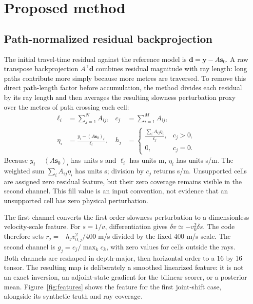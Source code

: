 \documentclass[11pt]{article}
\begin{document}
\section{Proposed method}
\label{sec:method}
\subsection{Path-normalized residual backprojection}
\label{sec:feature}
The initial travel-time residual against the reference model is $\mathbf{d}=\mathbf{y}-A\mathbf{s}_0$. A raw transpose backprojection $A^{\mathsf T}\mathbf{d}$ combines residual magnitude with ray length: long paths contribute more simply because more metres are traversed. To remove this direct path-length factor before accumulation, the method divides each residual by its ray length and then averages the resulting slowness perturbation proxy over the metres of path crossing each cell:
\begin{align}
\ell_i &= \sum_{j=1}^{N} A_{ij}, & c_j &= \sum_{i=1}^{M} A_{ij}, \\
\eta_i &= \frac{y_i - (A\mathbf{s}_0)_i}{\ell_i}, &
h_j &= \begin{cases}\displaystyle \frac{\sum_i A_{ij}\eta_i}{c_j},&c_j>0,\\0,&c_j=0.\end{cases}
\label{eq:feature}
\end{align}
Because $y_i-(A\mathbf{s}_0)_i$ has units s and $\ell_i$ has units m, $\eta_i$ has units s/m. The weighted sum $\sum_i A_{ij}\eta_i$ has units s; division by $c_j$ returns s/m. Unsupported cells are assigned zero residual feature, but their zero coverage remains visible in the second channel. This fill value is an input convention, not evidence that an unsupported cell has zero physical perturbation.

The first channel converts the first-order slowness perturbation to a dimensionless velocity-scale feature. For $s=1/v$, differentiation gives $\delta v\simeq-v_0^2\delta s$. The code therefore sets $r_j=-h_jv_{0,j}^{2}/400$ m/s divided by the fixed 400 m/s scale. The second channel is $g_j=c_j/\max_k c_k$, with zero values for cells outside the rays. Both channels are reshaped in depth-major, then horizontal order to a 16 by 16 tensor. The resulting map is deliberately a smoothed linearized feature: it is not an exact inversion, an adjoint-state gradient for the bilinear scorer, or a posterior mean. Figure~\ref{fig:features} shows the feature for the first joint-shift case, alongside its synthetic truth and ray coverage.
\end{document}
